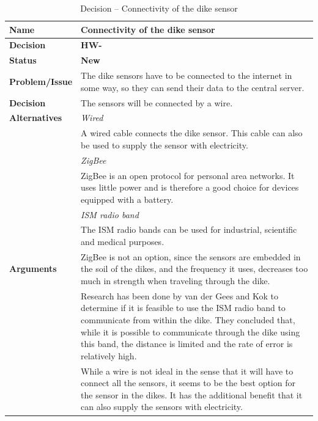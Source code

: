 \begin{table}[h!]
\begin{tabular}{L{0.2\textwidth} L{0.6\textwidth}}
    \textbf{Name}           & \textbf{Connectivity of the dike sensor} \\ \toprule
    \textbf{Decision}       & \textbf{HW-\textbf{}}\\ \midrule
    \textbf{Status}         & \textbf{New} \\ \midrule
    \textbf{Problem/Issue}  & The dike sensors have to be connected to the internet in some way, so they can send their data to the central server. \\ \midrule
    \textbf{Decision}       & The sensors will be connected by a wire.\\ \midrule
    \textbf{Alternatives}   & \textit{Wired}\\
                            & A wired cable connects the dike sensor. This cable can also be used to supply the sensor with electricity. \\
                            & \textit{ZigBee}\\
                            & ZigBee is an open protocol for personal area networks. It uses little power and is therefore a good choice for devices equipped with a battery. \\
                            & \textit{ISM radio band} \\
                            & The ISM radio bands can be used for industrial, scientific and medical purposes.  \\
                            \midrule
    \textbf{Arguments}      & ZigBee is not an option, since the sensors are embedded in the soil of the dikes, and the frequency it uses, decreases too much in strength when traveling through the dike\cite{van2009draadloos}. \\
                            & Research has been done by van der Gees and Kok \cite{van2009draadloos} to determine if it is feasible to use the ISM radio band to communicate from within the dike. They concluded that, while it is possible to communicate through the dike using this band, the distance is limited and the rate of error is relatively high.
                            \\
                            & While a wire is not ideal in the sense that it will have to connect all the sensors, it seems to be the best option for the sensor in the dikes. It has the additional benefit that it can also supply the sensors with electricity.
    \\ \bottomrule
\end{tabular}
\caption{Decision -- Connectivity of the dike sensor}
\label{table:linux}
\end{table}


